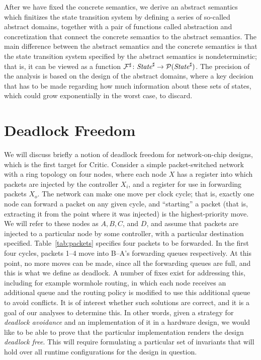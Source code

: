 \documentclass[10pt,conference]{IEEEtran}
\begin{document}
After we have fixed the concrete semantics,
we derive an abstract semantics which finitizes the state transition system
by defining a series of so-called abstract domains, together with a pair of functions
called abstraction and concretization that connect the concrete semantics to the abstract
semantics. The main difference between the abstract semantics and the concrete semantics is that
the state transition system specified by the abstract semantics is nondeterminstic; that is, it
can be viewed as a function $\mathcal F^\sharp\colon \mathit{State}^\sharp\to\mathcal P(\mathit{State}^\sharp)$. The precision of the
analysis is based on the design of the abstract domains, where a key decision that has to be made
regarding how much information about these sets of states, which could grow exponentially in the worst
case, to discard.

\section{Deadlock Freedom}
We will discuss briefly a notion of deadlock freedom for network-on-chip designs, which is the
first target for Critic.
Consider a simple packet-switched network with a ring topology on four nodes, 
where each node $X$ has a register into which packets are injected by the controller $X_i$,
and a register for use in forwarding packets $X_o$. The network can make one move per clock
cycle; that is, exactly one node can forward a packet on any given cycle, and ``starting''
a packet (that is, extracting it from the point where it was injected) is the highest-priority move.
We will refer to these nodes as $A,B,C$, and $D$, and assume that packets are injected
to a particular node by some controller, with a particular destination specified.
Table~\ref{tab:packets} specifies four packets to be forwarded. In the first four cycles,
packets 1--4 move into B--A's forwarding queues respectively. At this point, no more moves can be made,
since all the forwarding queues are full, and this is what we define as deadlock. A number of fixes
exist for addressing this, including for example wormhole routing, in which each node receives an additional
queue and the routing policy is modified to use this additional queue to avoid conflicts. It is of interest
whether such solutions are correct, and it is a goal of our analyses to determine this. In other words,
given a strategy for \emph{deadlock avoidance} and an implementation of it in a hardware design, we would like
to be able to prove that the particular implementation renders the design \emph{deadlock free}. This will
require formulating a particular set of invariants that will hold over all runtime configurations for the
design in question.
\end{document}
